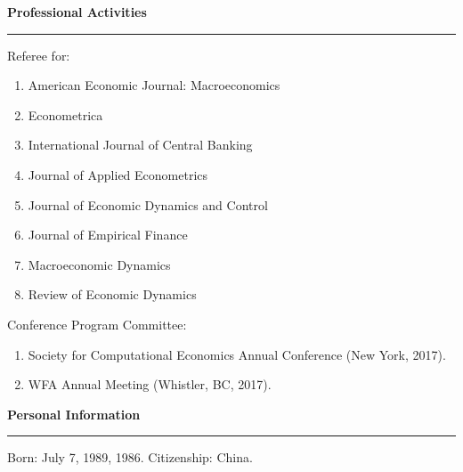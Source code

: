 \documentclass[a4paper, 10pt]{article}
\newcommand{\cvsec}[1]
{
	\needspace{2\baselineskip}
	\noindent \textbf{#1}
	
	\vspace{2pt}
	
	\hrule
	
	\bigskip
}
\newenvironment{cvfree}[1]
{
	\cvsec{#1}
	}
	{
	\bigskip
}
\begin{document}

\begin{cvfree}{Professional Activities}
	Referee for:
	\begin{enumerate}
		\item American Economic Journal: Macroeconomics
		\item Econometrica
		\item International Journal of Central Banking
		\item Journal of Applied Econometrics
		\item Journal of Economic Dynamics and Control
		\item Journal of Empirical Finance
		\item Macroeconomic Dynamics
		\item Review of Economic Dynamics
	\end{enumerate}

Conference Program Committee: 
\begin{enumerate}
	\item Society for Computational Economics Annual Conference (New York, 2017).
	\item WFA Annual Meeting (Whistler, BC, 2017).
\end{enumerate}
\end{cvfree}















\begin{cvfree}{Personal Information}
Born: July 7, 1989, 1986. Citizenship: China.
\end{cvfree}
\end{document}

